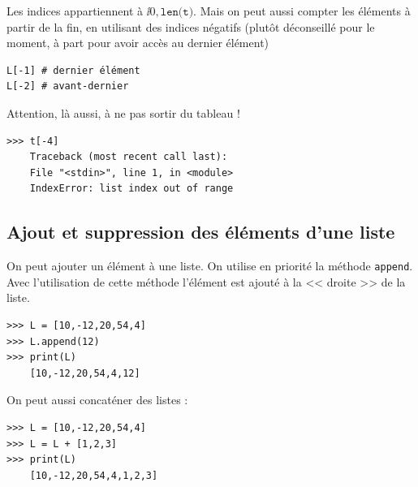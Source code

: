 %
%
%
%
%



Les indices appartiennent à $\ii{0,\texttt{len(t)}}$.
Mais on peut aussi compter les éléments à partir de la fin, en utilisant des indices négatifs (plutôt déconseillé pour le moment, à part pour avoir accès au dernier élément)
\begin{lstlisting}
L[-1] # dernier élément
L[-2] # avant-dernier
\end{lstlisting}

Attention, là aussi, à ne pas sortir du tableau !

\begin{lstlisting}
>>> t[-4]
    Traceback (most recent call last):
    File "<stdin>", line 1, in <module>
    IndexError: list index out of range
\end{lstlisting}


\subsection{Ajout et suppression des éléments d'une liste}
On peut ajouter un élément à une liste. On utilise en priorité la méthode \lstinline{append}. Avec l'utilisation de cette méthode l'élément est ajouté à la << droite >> de la liste. 

\begin{lstlisting}
>>> L = [10,-12,20,54,4]
>>> L.append(12)
>>> print(L)
    [10,-12,20,54,4,12]
\end{lstlisting}

On peut aussi concaténer des listes :
\begin{lstlisting}
>>> L = [10,-12,20,54,4]
>>> L = L + [1,2,3]
>>> print(L)
    [10,-12,20,54,4,1,2,3]
\end{lstlisting}




